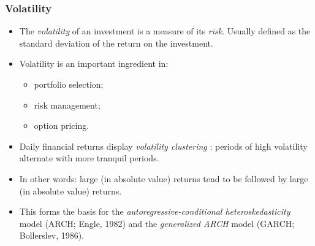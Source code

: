 \begin{frame}%

\frametitle{Volatility}

\begin{itemize}
\item The \emph{\color{red}volatility} of an investment is a measure of its
\emph{\color{red}risk}. Usually defined as the standard deviation of the
return on the investment.

\item Volatility is an important ingredient in:

\begin{itemize}
\item portfolio selection;

\item risk management;

\item option pricing.
\end{itemize}

\item Daily financial returns display \emph{\color{red}volatility clustering}%
: periods of high volatility alternate with more tranquil periods.
\item In other words: large (in absolute value) returns tend to be
followed by large (in absolute value) returns.

\item This forms the basis for the \emph{\color{red}%
autoregressive-conditional heteroskedasticity} model (ARCH; Engle, 1982) and
the \emph{\color{red}generalized ARCH} model (GARCH; Bollerslev, 1986).
\end{itemize}

\end{frame}%

